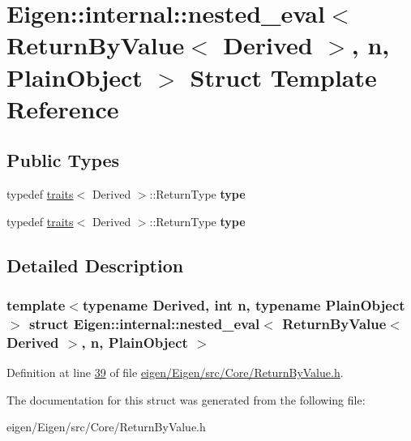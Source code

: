\hypertarget{struct_eigen_1_1internal_1_1nested__eval_3_01_return_by_value_3_01_derived_01_4_00_01n_00_01_plain_object_01_4}{}\section{Eigen\+:\+:internal\+:\+:nested\+\_\+eval$<$ Return\+By\+Value$<$ Derived $>$, n, Plain\+Object $>$ Struct Template Reference}
\label{struct_eigen_1_1internal_1_1nested__eval_3_01_return_by_value_3_01_derived_01_4_00_01n_00_01_plain_object_01_4}
\subsection*{Public Types}
\begin{DoxyCompactItemize}
\item 
\mbox{\label{struct_eigen_1_1internal_1_1nested__eval_3_01_return_by_value_3_01_derived_01_4_00_01n_00_01_plain_object_01_4_a2548d47a8e27255de008b64a904a9046}} 
typedef \hyperlink{struct_eigen_1_1internal_1_1traits}{traits}$<$ Derived $>$\+::Return\+Type {\bfseries type}
\item 
\mbox{\label{struct_eigen_1_1internal_1_1nested__eval_3_01_return_by_value_3_01_derived_01_4_00_01n_00_01_plain_object_01_4_a2548d47a8e27255de008b64a904a9046}} 
typedef \hyperlink{struct_eigen_1_1internal_1_1traits}{traits}$<$ Derived $>$\+::Return\+Type {\bfseries type}
\end{DoxyCompactItemize}


\subsection{Detailed Description}
\subsubsection*{template$<$typename Derived, int n, typename Plain\+Object$>$\newline
struct Eigen\+::internal\+::nested\+\_\+eval$<$ Return\+By\+Value$<$ Derived $>$, n, Plain\+Object $>$}



Definition at line \hyperlink{eigen_2_eigen_2src_2_core_2_return_by_value_8h_source_l00039}{39} of file \hyperlink{eigen_2_eigen_2src_2_core_2_return_by_value_8h_source}{eigen/\+Eigen/src/\+Core/\+Return\+By\+Value.\+h}.



The documentation for this struct was generated from the following file\+:\begin{DoxyCompactItemize}
\item 
eigen/\+Eigen/src/\+Core/\+Return\+By\+Value.\+h\end{DoxyCompactItemize}
